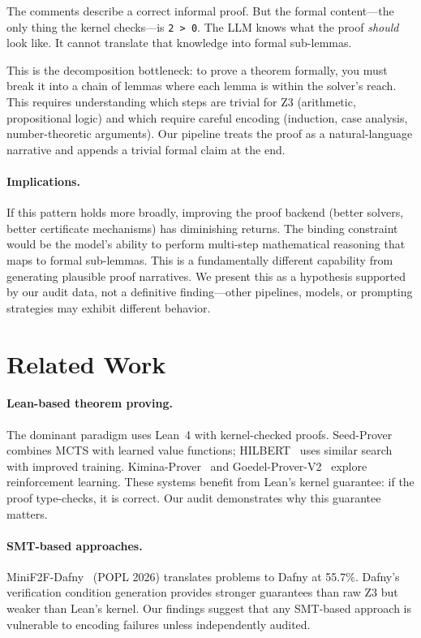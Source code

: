 \documentclass[11pt]{article}
\begin{document}
The comments describe a correct informal proof. But the formal content---the only thing the kernel checks---is \texttt{2 > 0}. The LLM knows what the proof \emph{should} look like. It cannot translate that knowledge into formal sub-lemmas.

This is the decomposition bottleneck: to prove a theorem formally, you must break it into a chain of lemmas where each lemma is within the solver's reach. This requires understanding which steps are trivial for Z3 (arithmetic, propositional logic) and which require careful encoding (induction, case analysis, number-theoretic arguments). Our pipeline treats the proof as a natural-language narrative and appends a trivial formal claim at the end.

\paragraph{Implications.} If this pattern holds more broadly, improving the proof backend (better solvers, better certificate mechanisms) has diminishing returns. The binding constraint would be the model's ability to perform multi-step mathematical reasoning that maps to formal sub-lemmas. This is a fundamentally different capability from generating plausible proof narratives. We present this as a hypothesis supported by our audit data, not a definitive finding---other pipelines, models, or prompting strategies may exhibit different behavior.

\section{Related Work}\label{sec:related}

\paragraph{Lean-based theorem proving.}
The dominant paradigm uses Lean~4 with kernel-checked proofs. Seed-Prover~\cite{seedprover2025} combines MCTS with learned value functions; HILBERT~\cite{hilbert2025} uses similar search with improved training. Kimina-Prover~\cite{kimina2025} and Goedel-Prover-V2~\cite{goedel2025} explore reinforcement learning. These systems benefit from Lean's kernel guarantee: if the proof type-checks, it is correct. Our audit demonstrates why this guarantee matters.

\paragraph{SMT-based approaches.}
MiniF2F-Dafny~\cite{minif2fdafny2026} (POPL 2026) translates problems to Dafny at 55.7\%. Dafny's verification condition generation provides stronger guarantees than raw Z3 but weaker than Lean's kernel. Our findings suggest that any SMT-based approach is vulnerable to encoding failures unless independently audited.
\end{document}
